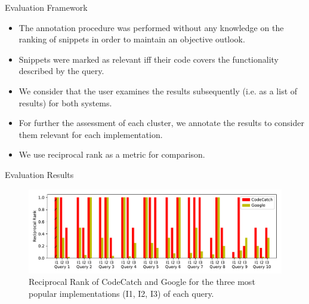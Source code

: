 \documentclass[compress]{beamer}
\begin{document}

\begin{frame}{Evaluation Framework}

\begin{itemize}

\item The annotation procedure was performed without any knowledge on the ranking of snippets in order to maintain an objective outlook.

\pause

\item Snippets were marked as {\Medium relevant} iff their code covers the functionality described by the query.

\pause
\item  We consider that the user examines the results subsequently (i.e. as a list of results) for both systems.

\pause
\item For further the assessment of each cluster, we annotate the results to consider them relevant for each implementation.

\pause
\item We use {\Medium reciprocal rank} as a metric for comparison.

\end{itemize}

\end{frame}


\begin{frame}{Evaluation Results}

\begin{figure}
\includegraphics[width=\textwidth]{reciprocalrank}
\caption[]{Reciprocal Rank of CodeCatch and Google for the three most popular implementations (I1, I2, I3) of each query.}
\end{figure}



\end{frame}
\end{document}
